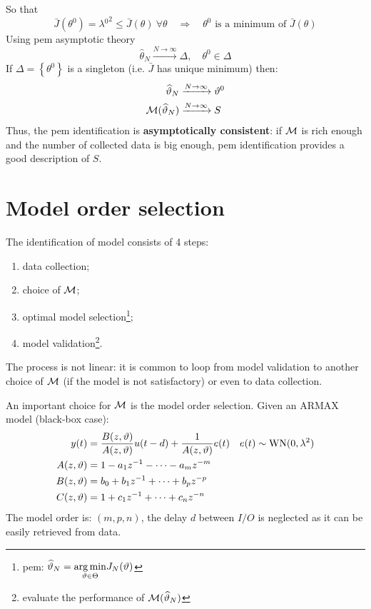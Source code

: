 So that
\begin{equation*}
\bar{J}\left(\theta ^{0}\right) = \lambda {^{0}}^{2} \leq \bar{J}(\theta)\  \forall \theta \quad\Longrightarrow\quad \theta ^{0} \text{ is a minimum of } \bar{J}(\theta)
\end{equation*}
Using \gls{pem} asymptotic theory
\begin{equation*}
\hat{\theta }_{N}\xrightarrow{N\rightarrow \infty} \Delta ,\quad\theta ^{0} \in \Delta 
\end{equation*}
If $ \Delta =\left\{\theta ^{0}\right\}$ is a singleton (i.e. $ \bar{J}$ has unique minimum) then:
\begin{align*}
	\widehat{\vartheta }_{N} & \xrightarrow{N\rightarrow \infty} \vartheta ^{0}\\
	\mathcal{M}(\widehat{\vartheta }_{N}) & \xrightarrow{N\rightarrow \infty} S
\end{align*}
Thus, the \gls{pem} identification is \textbf{asymptotically consistent}: if $ \mathcal{M}$ is rich enough and the number of collected data is big enough, \gls{pem} identification provides a good description of $ S$.



\section{Model order selection}

The identification of model consists of 4 steps:
\begin{enumerate}
\item data collection;
\item choice of $ \mathcal{M}$;
\item optimal model selection\footnote{\gls{pem}: $ \widehat{\vartheta }_{N} =\underset{\vartheta \in \Theta }{\operatorname*{arg\,min}} J_{N}(\vartheta)$};
\item model validation\footnote{evaluate the performance of $\mathcal{M}(\widehat{\vartheta }_{N})$}.
\end{enumerate}

The process is not linear: it is common to loop from model validation to another choice of $ \mathcal{M}$ (if the model is not satisfactory) or even to data collection.

An important choice for $ \mathcal{M}$ is the model order selection. Given an ARMAX model (black-box case):
\begin{gather*}
\begin{aligned}
y(t)  & =\frac{B(z,\vartheta)}{A(z,\vartheta)} u(t-d) +\frac{1}{A(z,\vartheta)} e(t) & e(t) \sim \operatorname{WN} (0,\lambda ^{2})\\
A(z,\vartheta)  & =1-a_{1} z^{-1} -\cdots -a_{m} z^{-m} & \\
B(z,\vartheta) & =b_{0} +b_{1} z^{-1} +\cdots +b_{p} z^{-p} & \\
C(z,\vartheta) & =1+c_{1} z^{-1} +\cdots +c_{n} z^{-n} & 
\end{aligned}\\
\end{gather*}
The model order is: $ (m,p,n)$, the delay $ d$ between $ I/O$ is neglected as it can be easily retrieved from data.

